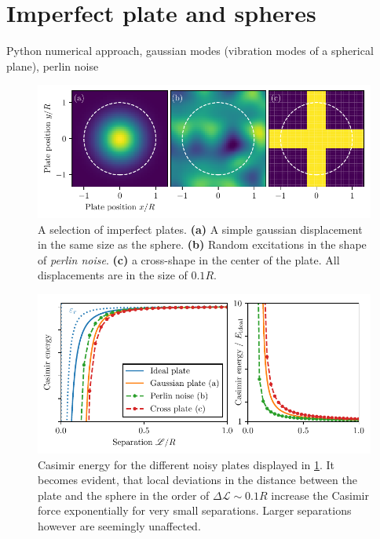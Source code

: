 \section{Imperfect plate and spheres}
\label{sec:3:imperfect-plates}

Python numerical approach, gaussian modes (vibration modes of a spherical plane), perlin noise

\begin{figure}[!htbp]
  \centering
  \includegraphics[width=\textwidth]{../figures/imperfect-plates.pdf}
  \caption{A selection of imperfect plates. \textbf{(a)} A simple gaussian displacement in the same size as the sphere. \textbf{(b)} Random excitations in the shape of \textit{perlin noise}. \textbf{(c)} a cross-shape in the center of the plate. All displacements are in the size of $0.1R$.}
  \label{fig:3:imperfect-plates}
\end{figure}

\begin{figure}[!htbp]
  \centering
  \includegraphics[width=\textwidth]{../figures/casimir-potential-imperfect-plates-relative.pdf}
  \caption{Casimir energy for the different noisy plates displayed in \cref{fig:3:imperfect-plates}. It becomes evident, that local deviations in the distance between the plate and the sphere in the order of $\Delta \mathscr{L} \sim 0.1R$ increase the Casimir force exponentially for very small separations. Larger separations however are seemingly unaffected.}
  \label{fig:3:casimir-imperfect-plates}
\end{figure}